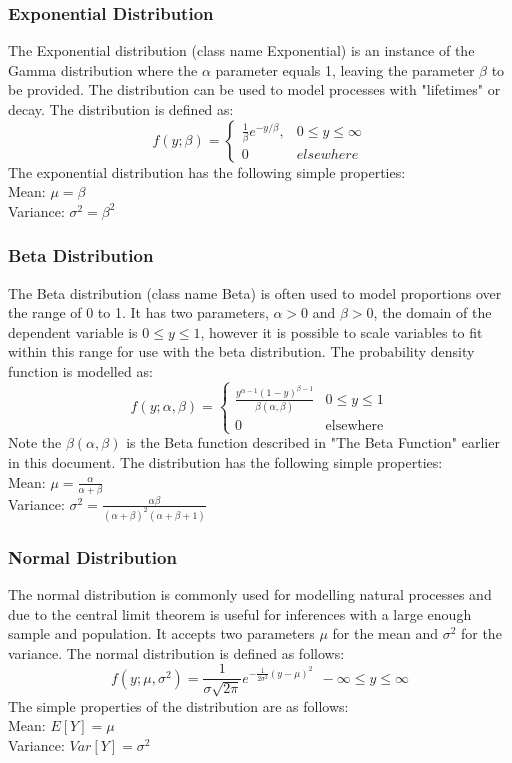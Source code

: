 \documentclass[a4paper]{article}
\begin{document}
\subsubsection*{Exponential Distribution}
The Exponential distribution (class name Exponential) is an instance of the Gamma distribution where the $\alpha$ parameter equals 1, leaving the parameter $\beta$ to be provided. The distribution can be used to model processes with "lifetimes" or decay. The distribution is defined as:
\[
f(y; \beta) =
	\begin{cases}
		\frac{1}{\beta} e^{-y/\beta}, & 0 \le y \le \infty\\
		0 & elsewhere
	\end{cases}
\]
The exponential distribution has the following simple properties:\\
Mean: $\mu = \beta$\\
Variance: $\sigma^2 = \beta^2$


\subsubsection*{Beta Distribution}
The Beta distribution (class name Beta) is often used to model proportions over the range of 0 to 1. It has two parameters, $\alpha > 0$ and $\beta > 0$, the domain of the dependent variable is $0 \le y \le 1$, however it is possible to scale variables to fit within this range for use with the beta distribution. The probability density function is modelled as:
\[
f(y; \alpha, \beta) = 
	\begin{cases}
		\frac{ y^{\alpha - 1} (1- y)^{\beta - 1} }{ \beta(\alpha, \beta) } & 0 \le y \le 1\\
		0 & \text{elsewhere}
	\end{cases}
\]
Note the $\beta(\alpha, \beta)$ is the Beta function described in "The Beta Function" earlier in this document. The distribution has the following simple properties:\\
Mean: $\mu = \frac{\alpha}{\alpha + \beta}$\\
Variance: $\sigma^2 = \frac{\alpha\beta}{(\alpha + \beta)^2(\alpha + \beta + 1)}$

\subsubsection*{Normal Distribution}

The normal distribution is commonly used for modelling natural processes and due to the central limit theorem is useful for inferences with a large enough sample and population. It accepts two parameters $\mu$ for the mean and $\sigma^2$ for the variance. The normal distribution is defined as follows:
$$
f(y; \mu, \sigma^2) =
		\frac{1}{\sigma \sqrt{2\pi} } e^{-\frac{1}{2\sigma^2}(y - \mu)^2} \ \  -\infty \le y \le \infty
$$
The simple properties of the distribution are as follows:\\
Mean: $E[Y] = \mu$\\
Variance: $Var[Y] = \sigma^2$
\end{document}
